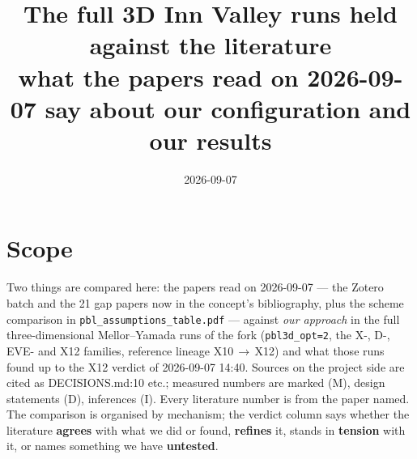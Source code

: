 \documentclass[10pt,a4paper]{article}
\title{\vspace{-1.5em}The full 3D Inn Valley runs held against the literature\\[2pt]
\large what the papers read on 2026-09-07 say about our configuration and our results\vspace{-0.5em}}
\author{}
\date{2026-09-07}
\newcommand{\src}[1]{{\scriptsize\textcolor{black!60}{#1}}}
\newcommand{\agree}{\textcolor{green!45!black}{\textbf{agrees}}}
\newcommand{\tension}{\textcolor{red!60!black}{\textbf{tension}}}
\newcommand{\untested}{\textcolor{orange!70!black}{\textbf{untested}}}
\newcommand{\refines}{\textcolor{blue!60!black}{\textbf{refines}}}
\begin{document}
\maketitle
\vspace{-2.5em}

\section*{Scope}
Two things are compared here: the papers read on 2026-09-07 --- the Zotero batch and the 21 gap papers now in the concept's bibliography, plus the scheme comparison in \texttt{pbl\_assumptions\_table.pdf} --- against \emph{our approach} in the full three-dimensional Mellor--Yamada runs of the fork (\texttt{pbl3d\_opt=2}, the X-, D-, EVE- and X12 families, reference lineage X10\,$\to$\,X12) and what those runs found up to the X12 verdict of 2026-09-07 14:40. Sources on the project side are cited as \src{DECISIONS.md:10} etc.; measured numbers are marked (M), design statements (D), inferences (I). Every literature number is from the paper named. The comparison is organised by mechanism; the verdict column says whether the literature \agree{} with what we did or found, \refines{} it, stands in \tension{} with it, or names something we have \untested.
\end{document}
